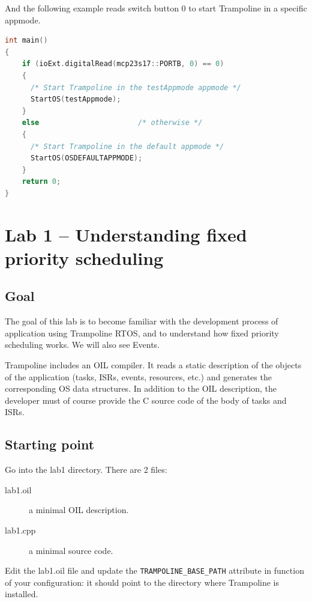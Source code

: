 \documentclass[11pt]{report}
\begin{document}
And the following example reads switch button {0} to start Trampoline in a specific appmode.

\begin{lstlisting}[language=C]
int main()
{
    if (ioExt.digitalRead(mcp23s17::PORTB, 0) == 0)
    {
      /* Start Trampoline in the testAppmode appmode */
      StartOS(testAppmode);
    }
    else                       /* otherwise */
    {
      /* Start Trampoline in the default appmode */
      StartOS(OSDEFAULTAPPMODE);
    }
    return 0;
}
\end{lstlisting}


\chapter{Lab 1 -- Understanding fixed priority scheduling}

\section{Goal}

The goal of this lab is to become familiar with the development
process of application using Trampoline RTOS, and to understand how fixed priority scheduling works.
We will also see Events.

Trampoline includes an OIL compiler.
It reads a static description of the objects of the application (tasks,
ISRs, events, resources, etc.) and generates the corresponding OS data structures.
In addition to the OIL description, the developer must of course provide the C
source code of the body of tasks and ISRs.


\section{Starting point}

Go into the lab1 directory. There are 2 files:

\begin{description}
    \item[lab1.oil] a minimal OIL description.
    \item[lab1.cpp] a minimal source code.
\end{description}

Edit the lab1.oil file and update the \texttt{TRAMPOLINE\_BASE\_PATH} attribute
in function of your configuration: it should point to the directory where Trampoline is installed.

\end{document}
